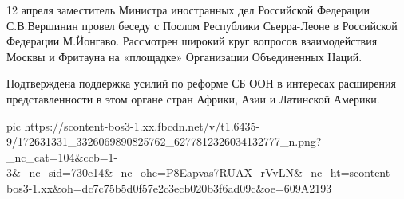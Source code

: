  
 
 
 
 

12 апреля заместитель Министра иностранных дел Российской Федерации
С.В.Вершинин провел беседу с Послом Республики Сьерра-Леоне в Российской
Федерации М.Йонгаво. Рассмотрен широкий круг вопросов взаимодействия Москвы и
Фритауна на «площадке» Организации Объединенных Наций.

Подтверждена поддержка усилий по реформе СБ ООН в интересах расширения
представленности в этом органе стран Африки, Азии и Латинской Америки.


\ifcmt
  pic https://scontent-bos3-1.xx.fbcdn.net/v/t1.6435-9/172631331_3326069890825762_6277812326034132777_n.png?_nc_cat=104&ccb=1-3&_nc_sid=730e14&_nc_ohc=P8Eapvas7RUAX_rVvLN&_nc_ht=scontent-bos3-1.xx&oh=dc7c75b5d0f57e2c3ecb020b3f6ad09c&oe=609A2193
\fi

